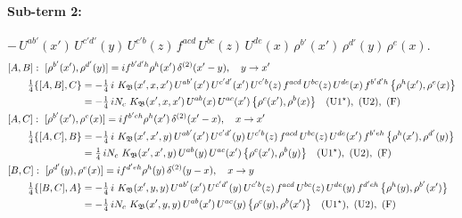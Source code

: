 \documentclass[10pt]{article}
\numberwithin{equation}{section}
\begin{document}
\paragraph{Sub-term 2:} $-\,U^{ab'}(x')\,U^{c'd'}(y)\,U^{c'b}(z)\,f^{acd}\,U^{bc}(z)\,U^{de}(x)\,\rho^{b'}(x')\,\rho^{d'}(y)\,\rho^{e}(x)$.
\begin{align}
&[A,B]:\ [\rho^{b'}(x'),\rho^{d'}(y)]=i f^{b'd'h}\rho^{h}(x')\,\delta^{(2)}(x'-y),\quad y\to x'\notag\\
&\qquad \tfrac14\{[A,B],C\}=-\tfrac14\,i\,\,K_{\mathfrak B}(x',x,x')\,U^{ab'}(x')\,U^{c'd'}(x')\,U^{c'b}(z)\,f^{acd}\,U^{bc}(z)\,U^{de}(x)\,f^{b'd'h}\,\big\{\rho^{h}(x'),\rho^{e}(x)\big\}\notag\\
&\qquad\phantom{\tfrac14\{[A,B],C\}}=-\tfrac14\,i N_{c}\,\,K_{\mathfrak B}(x',x,x')\,U^{ab}(x)\,U^{ac}(x')\,\big\{\rho^{c}(x'),\rho^{b}(x)\big\}\quad\text{(U1$^\star$)},\ \text{(U2)},\ \text{(F)}
\label{R:eq:GIII.I-2-AB}\\
&[A,C]:\ [\rho^{b'}(x'),\rho^{e}(x)]=i f^{b'eh}\rho^{h}(x')\,\delta^{(2)}(x'-x),\quad x\to x'\notag\\
&\qquad \tfrac14\{[A,C],B\}=-\tfrac14\,i\,\,K_{\mathfrak B}(x',x',y)\,U^{ab'}(x')\,U^{c'd'}(y)\,U^{c'b}(z)\,f^{acd}\,U^{bc}(z)\,U^{de}(x')\,f^{b'eh}\,\big\{\rho^{h}(x'),\rho^{d'}(y)\big\}\notag\\
&\qquad\phantom{\tfrac14\{[A,C],B\}}=\tfrac14\,i N_{c}\,\,K_{\mathfrak B}(x',x',y)\,U^{ab}(y)\,U^{ac}(x')\,\big\{\rho^{c}(x'),\rho^{b}(y)\big\}\quad\text{(U1$^\star$)},\ \text{(U2)},\ \text{(F)}
\label{R:eq:GIII.I-2-AC}\\
&[B,C]:\ [\rho^{d'}(y),\rho^{e}(x)]=i f^{d'eh}\rho^{h}(y)\,\delta^{(2)}(y-x),\quad x\to y\notag\\
&\qquad \tfrac14\{[B,C],A\}=-\tfrac14\,i\,\,K_{\mathfrak B}(x',y,y)\,U^{ab'}(x')\,U^{c'd'}(y)\,U^{c'b}(z)\,f^{acd}\,U^{bc}(z)\,U^{de}(y)\,f^{d'eh}\,\big\{\rho^{h}(y),\rho^{b'}(x')\big\}\notag\\
&\qquad\phantom{\tfrac14\{[B,C],A\}}=-\tfrac14\,i N_{c}\,\,K_{\mathfrak B}(x',y,y)\,U^{ab}(x')\,U^{ac}(y)\,\big\{\rho^{c}(y),\rho^{b}(x')\big\}\quad\text{(U1$^\star$)},\ \text{(U2)},\ \text{(F)}
\label{R:eq:GIII.I-2-BC}
\end{align}
\end{document}

